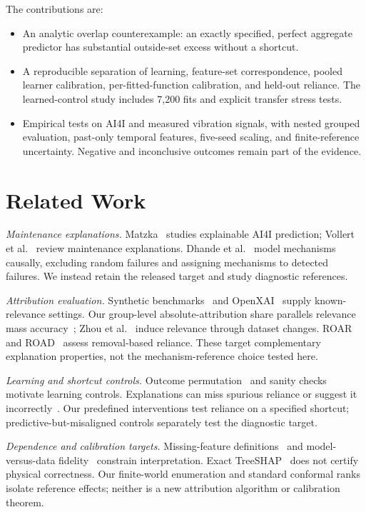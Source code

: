 \documentclass[conference]{IEEEtran}
\begin{document}
The contributions are:
\begin{itemize}
\item An analytic overlap counterexample: an exactly specified, perfect aggregate predictor has substantial outside-set excess without a shortcut.
\item A reproducible separation of learning, feature-set correspondence, pooled learner calibration, per-fitted-function calibration, and held-out reliance. The learned-control study includes 7,200 fits and explicit transfer stress tests.
\item Empirical tests on AI4I and measured vibration signals, with nested grouped evaluation, past-only temporal features, five-seed scaling, and finite-reference uncertainty. Negative and inconclusive outcomes remain part of the evidence.
\end{itemize}

\section{Related Work}
\label{sec:related}
\textit{Maintenance explanations.} Matzka~\cite{matzka2020explainable} studies explainable AI4I prediction; Vollert et al.~\cite{vollert2021interpretable} review maintenance explanations. Dhande et al.~\cite{causalbenchmark2026} model mechanisms causally, excluding random failures and assigning mechanisms to detected failures. We instead retain the released target and study diagnostic references.

\textit{Attribution evaluation.} Synthetic benchmarks~\cite{liu2021synthetic} and OpenXAI~\cite{agarwal2022openxai} supply known-relevance settings. Our group-level absolute-attribution share parallels relevance mass accuracy~\cite{arras2022clevr}; Zhou et al.~\cite{zhou2022attribute} induce relevance through dataset changes. ROAR~\cite{hooker2019roar} and ROAD~\cite{rong2022road} assess removal-based reliance. These target complementary explanation properties, not the mechanism-reference choice tested here.

\textit{Learning and shortcut controls.} Outcome permutation~\cite{altmann2010permutation} and sanity checks~\cite{adebayo2018sanity} motivate learning controls. Explanations can miss spurious reliance or suggest it incorrectly~\cite{adebayo2022spurious}. Our predefined interventions test reliance on a specified shortcut; predictive-but-misaligned controls separately test the diagnostic target.

\textit{Dependence and calibration targets.} Missing-feature definitions~\cite{janzing2020feature,aas2021explaining} and model-versus-data fidelity~\cite{chen2020true} constrain interpretation. Exact TreeSHAP~\cite{lundberg2020treeshap} does not certify physical correctness. Our finite-world enumeration and standard conformal ranks~\cite{angelopoulos2023conformal} isolate reference effects; neither is a new attribution algorithm or calibration theorem.
\end{document}
